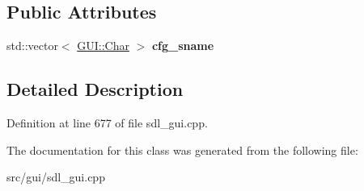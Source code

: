 \subsection*{Public Attributes}
\begin{DoxyCompactItemize}
\item 
\hypertarget{classSectionEditor_a4c40dec1763778f36a54ccbb5f0b264b}{std\-::vector$<$ \hyperlink{namespaceGUI_af6b04b46d40197b4f00e553d7d1a3e4c}{G\-U\-I\-::\-Char} $>$ {\bfseries cfg\-\_\-sname}}\label{classSectionEditor_a4c40dec1763778f36a54ccbb5f0b264b}

\end{DoxyCompactItemize}


\subsection{Detailed Description}


Definition at line 677 of file sdl\-\_\-gui.\-cpp.



The documentation for this class was generated from the following file\-:\begin{DoxyCompactItemize}
\item 
src/gui/sdl\-\_\-gui.\-cpp\end{DoxyCompactItemize}
